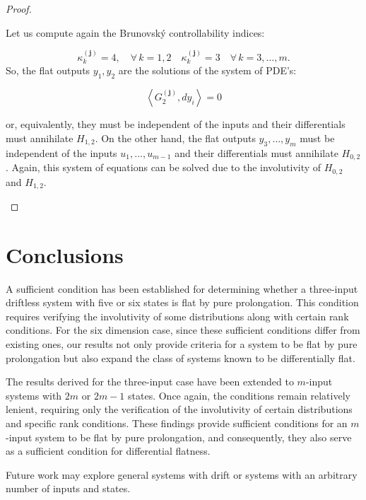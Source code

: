 \documentclass[10pt]{article}
\newcommand{\3}{\mathbf{3}}
\newcommand{\2}{\mathbf{2}}
\newcommand{\1}{\mathbf{1}}
\newcommand{\0}{\mathbf{0}}
\newcommand{\bj}{\mathbf{j}}
\begin{document}
\begin{proof}
\begin{enumerate}
Let us compute again the Brunovsk\'y controllability indices:

$$\kappa_{k}^{(\bj)}=4, \quad \forall \, k= 1,2  \quad \kappa_{k}^{(\bj)}=3 \quad \forall \, k= 3,\dots,m.$$
 So, the flat outputs $y_1,y_2$ are the solutions of the system of PDE's:

\[ \left< G_{2}^{(\bj)},  dy_{i} \right>= 0 \]

or, equivalently, they must be independent of the inputs and their differentials must annihilate $H_{1,2}$. On the other hand, the flat outputs $y_3,\dots,y_m$ must be independent of the inputs $u_1,\dots,u_{m-1}$ and their differentials must annihilate $H_{0,2}$. Again, this system of equations can be solved due to the involutivity of $H_{0,2}$ and $H_{1,2}$.

\end{enumerate}
\end{proof}

\section{Conclusions}

A sufficient condition has been established for determining whether a three-input driftless system with five or six states is flat by pure prolongation. This condition requires verifying the involutivity of some distributions along with certain rank conditions. For the six dimension case, since these sufficient conditions differ from existing ones, our results not only provide criteria for a system to be flat by pure prolongation but also expand the class of systems known to be differentially flat.

The results derived for the three-input case have been extended to $m$-input systems with $2m$ or $2m-1$ states. Once again, the conditions remain relatively lenient, requiring only the verification of the involutivity of certain distributions and specific rank conditions. These findings provide sufficient conditions for an $m$-input system to be flat by pure prolongation, and consequently, they also serve as a sufficient condition for differential flatness.

Future work may explore general systems with drift or systems with an arbitrary number of inputs and states.
\end{document}
